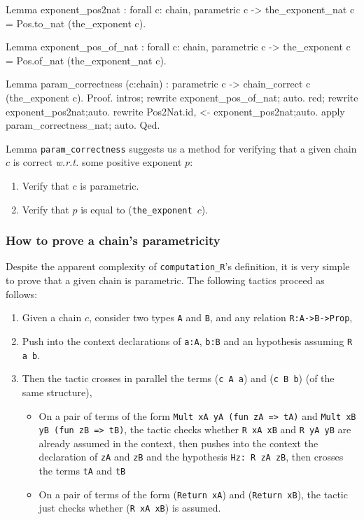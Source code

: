 \begin{Coqsrc}
Lemma exponent_pos2nat : forall c: chain,  parametric c -> 
  the_exponent_nat c = Pos.to_nat (the_exponent c).

Lemma exponent_pos_of_nat : forall c: chain,  parametric c -> 
  the_exponent c = Pos.of_nat (the_exponent_nat c).

Lemma param_correctness (c:chain) :
   parametric c -> 
   chain_correct c (the_exponent c). 
Proof.
  intros; rewrite  exponent_pos_of_nat; auto.
  red;  rewrite  exponent_pos2nat;auto.
  rewrite Pos2Nat.id,  <- exponent_pos2nat;auto.
  apply param_correctness_nat; auto.
Qed.
\end{Coqsrc}

Lemma \texttt{param\_correctness} suggests us a method for verifying 
that a given chain $c$ is correct \emph{w.r.t.} some positive exponent $p$:

\begin{enumerate}
\item Verify that $c$ is parametric.
\item Verify that $p$ is equal to (\texttt{the\_exponent $c$}).
\end{enumerate}

\subsubsection{How to prove a chain's parametricity}
Despite the apparent complexity of \texttt{computation\_R}'s definition,
it is very simple to prove that a given chain is parametric. The following tactics
proceed as follows:

\begin{enumerate}
\item Given a chain $c$, consider two types \texttt{A} and
\texttt{B}, and any relation \texttt{R:A->B->Prop}, 
\item Push into the context declarations of \texttt{a:A}, \texttt{b:B}
and an hypothesis assuming \texttt{R a b}.
\item Then the tactic crosses in parallel the terms (\texttt{c A a}) and
(\texttt{c B b}) (of the same structure),
\begin{itemize}
\item On a pair of terms of the form 
\texttt{Mult xA yA (fun zA => tA)} and \linebreak \texttt{Mult xB yB (fun zB => tB)}, the tactic checks whether 
   \texttt{R xA xB} and \texttt{R yA yB} are already assumed in the context,
 then  pushes into the context the declaration of \texttt{zA} and \texttt{zB}
and the hypothesis \linebreak \texttt{Hz: R zA zB}, then crosses the terms \texttt{tA} and
 \texttt{tB}
\item On a pair of terms  of the form   (\texttt{Return xA}) and (\texttt{Return xB}),
 the tactic just checks whether (\texttt{R xA xB}) is assumed.
\end{itemize}

\end{enumerate}


